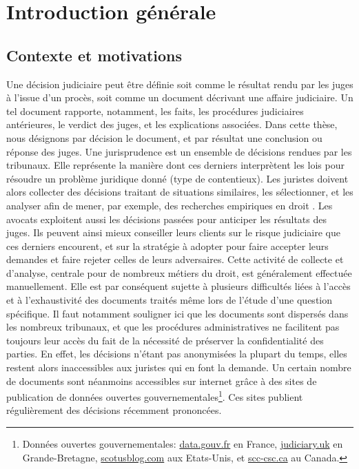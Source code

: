 \chapter*{Introduction générale}
\label{chap:intro}

\section{Contexte et motivations}
\label{sec:intro:contexte}
Une décision judiciaire peut être définie soit comme  le résultat rendu par les juges à l'issue d'un procès, soit comme un document décrivant une affaire judiciaire. Un tel document rapporte, notamment,  les faits, les procédures judiciaires antérieures, le verdict des juges, et les explications associées. Dans cette thèse, nous désignons par \og décision \fg{} le document, et par  \og résultat\fg{} une conclusion ou réponse des juges. Une jurisprudence
est un ensemble de décisions rendues par les tribunaux. Elle représente la manière dont ces derniers interprètent les lois pour résoudre un problème juridique donné (type de contentieux). Les juristes doivent alors collecter des décisions traitant de situations similaires, les sélectionner, et les analyser afin de mener, par exemple, des recherches empiriques en droit \citep{ancel2003expulsion, jeandidier2006pensions}. Les avocats exploitent aussi les décisions passées pour anticiper les résultats des juges. Ils peuvent ainsi mieux conseiller leurs clients sur le risque judiciaire que ces derniers encourent, et sur la stratégie à adopter pour faire accepter leurs demandes et faire rejeter celles de leurs adversaires. Cette activité de collecte et d'analyse, centrale pour de nombreux métiers du droit, est généralement effectuée manuellement. Elle est par conséquent sujette à plusieurs difficultés liées à l'accès et à l'exhaustivité des documents traités même lors de l'étude d'une question spécifique. Il faut notamment souligner ici que les documents sont dispersés dans les nombreux tribunaux, et que les procédures administratives ne facilitent pas toujours leur accès du fait de la nécessité de préserver la confidentialité des parties. En effet, les décisions n'étant pas \og anonymisées \fg{} la plupart du temps, elles restent alors inaccessibles aux juristes qui en font la demande. Un certain nombre de documents sont néanmoins accessibles sur internet grâce à des sites de publication de données ouvertes gouvernementales\footnote{Données ouvertes gouvernementales: \hyperlink{http://data.gouv.fr}{data.gouv.fr} en France, \hyperlink{https://www.judiciary.uk}{judiciary.uk} en Grande-Bretagne, \hyperlink{http://www.scotusblog.com/}{scotusblog.com} aux Etats-Unis, et \hyperlink{https://www.scc-csc.ca/}{scc-csc.ca} au Canada.}. Ces sites publient régulièrement des décisions récemment prononcées. 


